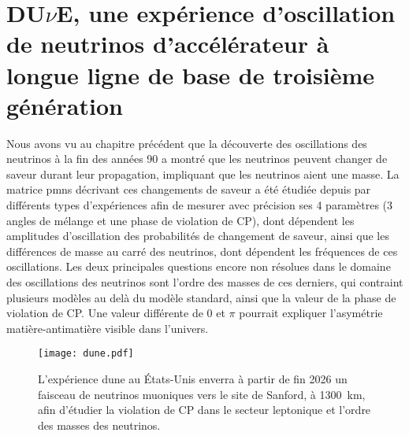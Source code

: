 

\chapter{\texorpdfstring{DU$\nu$E}{DUNE}, une expérience d'oscillation de neutrinos d'accélérateur à longue ligne de base de troisième génération}\label{chap::2}

  Nous avons vu au chapitre précédent que la découverte des oscillations des neutrinos à la fin des années 90 a montré que les neutrinos peuvent changer de saveur durant leur propagation, impliquant que les neutrinos aient une masse. La matrice \gls{pmns} décrivant ces changements de saveur a été étudiée depuis par différents types d'expériences afin de mesurer avec précision ses 4 paramètres (3 angles de mélange et une phase de violation de CP), dont dépendent les amplitudes d'oscillation des probabilités de changement de saveur, ainsi que les différences de masse au carré des neutrinos, dont dépendent les fréquences de ces oscillations. Les deux principales questions encore non résolues dans le domaine des oscillations des neutrinos sont l'ordre des masses de ces derniers, qui contraint plusieurs modèles au delà du modèle standard, ainsi que la valeur de la phase de violation de CP. Une valeur différente de 0 et $\pi$ pourrait expliquer l'asymétrie matière-antimatière visible dans l'univers.

  \begin{figure}[htbp]
    \texttt{[image: dune.pdf]}
    \caption[L'expérience DU$\nu$E]{\label{fig::dune}L'expérience \acrshort{dune} au États-Unis enverra à partir de fin 2026 un faisceau de neutrinos muoniques vers le site de Sanford, à \SI{1300}{\kilo\meter}, afin d'étudier la violation de CP dans le secteur leptonique et l'ordre des masses des neutrinos.}
  \end{figure}

